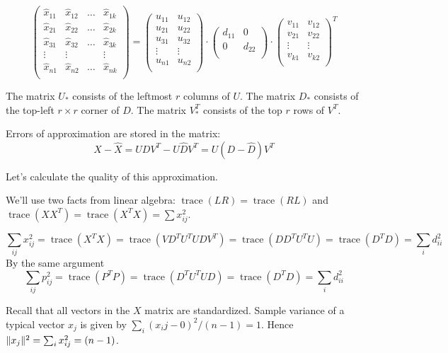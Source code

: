 \documentclass[12pt]{article}
\DeclareMathOperator{\trace}{trace}
\DeclarePairedDelimiter{\norm}{\lVert}{\rVert}
\begin{document}
\[
\begin{pmatrix}
    \hat x_{11} & \hat x_{12} & \dots & \hat x_{1k} \\
    \hat x_{21} & \hat x_{22} & \dots & \hat x_{2k} \\
    \hat x_{31} & \hat x_{32} & \dots & \hat x_{3k} \\
    \vdots & \vdots &    & \vdots \\
    \hat x_{n1} & \hat x_{n2} & \dots & \hat x_{nk} \\
\end{pmatrix} =
\begin{pmatrix}
    u_{11} & u_{12}  \\
    u_{21} & u_{22} \\
    u_{31} & u_{32} \\
    \vdots & \vdots \\
    u_{n1} & u_{n2} \\
\end{pmatrix} \cdot 
\begin{pmatrix}
    d_{11} & 0 \\
    0 & d_{22} \\
\end{pmatrix} \cdot
\begin{pmatrix}
    v_{11} & v_{12}  \\
    v_{21} & v_{22} \\
    \vdots & \vdots \\
    v_{k1} & v_{k2} \\
\end{pmatrix}^T
\]

The matrix $U_*$ consists of the leftmost $r$ columns of $U$.
The matrix $D_*$ consists of the top-left $r\times r$ corner of $D$.
The matrix $V_*^T$ consists of the top $r$ rows of $V^T$.


Errors of approximation are stored in the matrix:
\[
X - \hat X = UDV^T - U \hat D V^T = U(D - \hat D) V^T
\]


Let's calculate the quality of this approximation. 

We'll use two facts from linear algebra: $\trace(LR) = \trace(RL)$ and  $\trace(XX^T) = \trace(X^TX) = \sum x_{ij}^2$.

\[
\sum_{ij} x_{ij}^2 = \trace(X^TX) = \trace(VD^T U^TUDV^T ) = \trace(DD^T U^TU)= \trace(D^TD) = \sum_{i} d_{ii}^2
\]
By the same argument
\[
\sum_{ij} p_{ij}^2 = \trace(P^TP) = \trace(D^T U^T UD) =  \trace(D^TD) = \sum_{i} d_{ii}^2
\]

Recall that all vectors in the $X$ matrix are standardized.
Sample variance of a typical vector $x_j$ is given by $\sum_i (x_ij - 0)^2 / (n-1) = 1$.
Hence $\norm{x_j}^2 = \sum_i x_{ij}^2 = (n-1)$.
\end{document}
